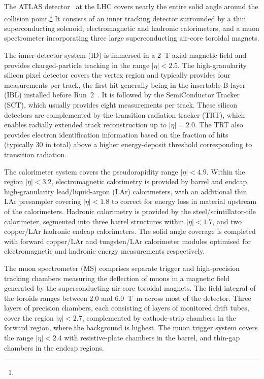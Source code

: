 The ATLAS detector~\cite{PERF-2007-01} at the LHC covers nearly the entire solid angle around the collision point.\footnote{\AtlasCoordFootnote}
It consists of an inner tracking detector surrounded by a thin superconducting solenoid, electromagnetic and hadronic calorimeters,
and a muon spectrometer incorporating three large superconducting air-core toroidal magnets.

The inner-detector system (ID) is immersed in a \qty{2}{\tesla} axial magnetic field 
and provides charged-particle tracking in the range \(|\eta| < 2.5\).
The high-granularity silicon pixel detector covers the vertex region and typically provides four measurements per track, 
the first hit generally being in the insertable B-layer (IBL) installed before Run~2~\cite{ATLAS-TDR-19,PIX-2018-001}.
It is followed by the SemiConductor Tracker (SCT), which usually provides eight measurements per track.
These silicon detectors are complemented by the transition radiation tracker (TRT),
which enables radially extended track reconstruction up to \(|\eta| = 2.0\). 
The TRT also provides electron identification information 
based on the fraction of hits (typically 30 in total) above a higher energy-deposit threshold corresponding to transition radiation.

The calorimeter system covers the pseudorapidity range \(|\eta| < 4.9\).
Within the region \(|\eta|< 3.2\), electromagnetic calorimetry is provided by barrel and 
endcap high-granularity lead/liquid-argon (LAr) calorimeters,
with an additional thin LAr presampler covering \(|\eta| < 1.8\)
to correct for energy loss in material upstream of the calorimeters.
Hadronic calorimetry is provided by the steel/scintillator-tile calorimeter,
segmented into three barrel structures within \(|\eta| < 1.7\), and two copper/LAr hadronic endcap calorimeters.
The solid angle coverage is completed with forward copper/LAr and tungsten/LAr calorimeter modules
optimised for electromagnetic and hadronic energy measurements respectively.

The muon spectrometer (MS) comprises separate trigger and
high-precision tracking chambers measuring the deflection of muons in a magnetic field generated by the superconducting air-core toroidal magnets.
The field integral of the toroids ranges between \num{2.0} and \qty{6.0}{\tesla\metre}
across most of the detector. 
Three layers of precision chambers, each consisting of layers of monitored drift tubes, cover the region \(|\eta| < 2.7\),
complemented by cathode-strip chambers in the forward region, where the background is highest.
The muon trigger system covers the range \(|\eta| < 2.4\) with resistive-plate chambers in the barrel, and thin-gap chambers in the endcap regions.

